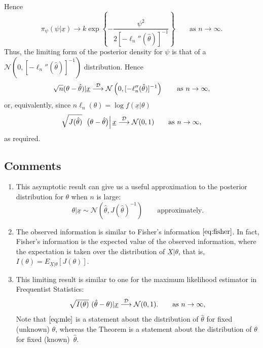Hence
$$
\pi_\psi(\psi|\underline{x})\to 
k\exp\left\{-\frac{\psi^2}{2[-\ell_n''(\hat\theta)]^{-1}}\right\}
\quad\quad\text{as }n\to\infty.
$$
Thus, the limiting form of the posterior density for $\psi$
is that of a $\mathcal{N}\left(0,[-\ell_n''(\hat\theta)]^{-1}\right)$
distribution. Hence
$$
\sqrt{n}(\theta-\hat\theta)|\underline{x}\stackrel{\cal D} \longrightarrow
\mathcal{N}\left(0,[-\ell_n''(\hat\theta)]^{-1}\right)
\quad\quad\text{as }n\to\infty,
$$
or, equivalently, since $n\ell_n(\theta)=\log f(\underline{x}|\theta)$
$$
\sqrt{J(\hat{\theta})}~\left.\bigl(\theta-\hat\theta\bigr)
\right|\underline{x}\stackrel{\cal D} \longrightarrow \mathcal{N}(0,1)
\quad\quad\text{as }n\to\infty,
$$
as required.
\subsection*{Comments}

\begin{enumerate}
\item This asymptotic result can give us a useful approximation to the
posterior distribution for $\theta$ when $n$ is large:
$$
\theta|\underline{x}\sim \mathcal{N}\left(\hat\theta,J(\hat{\theta})^{-1}
\right)
\quad\quad\text{approximately}.
$$
\item The observed information is similar to Fisher's information $\eqref{eq:fisher}$. In fact, Fisher's information is the expected value of the observed information, where the expectation is taken over the distribution of $\underline{X}|\theta$, that is, $I(\theta)=E_{\underline{X}|\theta}[J(\theta)]$.
\item This limiting result is similar to one for the maximum likelihood estimator in Frequentist Statistics:
\begin{equation}
\label{eq:mle}
\sqrt{I(\theta)}~(\hat{\theta}-\theta)|\underline{x}
\stackrel{\cal D} \longrightarrow \mathcal{N}(0,1).
\quad\quad\text{as }n\to\infty, 
\end{equation}
Note that $\eqref{eq:mle}$ is a statement about the distribution of $\hat{\theta}$ for fixed (unknown) $\theta$, whereas the Theorem is a statement about the distribution of $\theta$ for fixed (known)~$\hat{\theta}$.
\end{enumerate}

\clearpage
